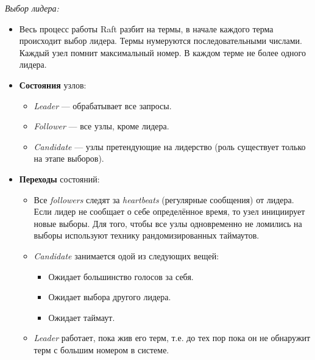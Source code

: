\begin{algorithm} \textit{Выбор лидера:}
    \begin{itemize}
        \item Весь процесс работы Raft разбит на термы, в начале каждого терма
            происходит выбор лидера. Термы нумеруются последовательными числами.
            Каждый узел помнит максимальный номер. В каждом терме не более
            одного лидера.
        \item \textbf{Состояния} узлов:
            \begin{itemize}
                \item \textit{Leader} --- обрабатывает все запросы.
                \item \textit{Follower} --- все узлы, кроме лидера.
                \item \textit{Candidate} --- узлы претендующие на лидерство
                    (роль существует только на этапе выборов).
            \end{itemize}
        \newpage
        \item \textbf{Переходы} состояний:
            \begin{itemize}
                \item Все \textit{followers} следят за \textit{heartbeats}
                    (регулярные сообщения) от лидера. Если лидер не сообщает
                    о себе определённое время, то узел инициирует новые выборы.
                    Для того, чтобы все узлы одновременно не ломились на выборы
                    используют технику рандомизированных таймаутов.
                \item \textit{Candidate} занимается одой из следующих вещей:
                    \begin{itemize}
                        \item Ожидает большинство голосов за себя.
                        \item Ожидает выбора другого лидера.
                        \item Ожидает таймаут.
                    \end{itemize}
                \item \textit{Leader} работает, пока жив его терм, т.е. до тех пор
                    пока он не обнаружит терм с большим номером в системе.
            \end{itemize}
    \end{itemize}
\end{algorithm}

